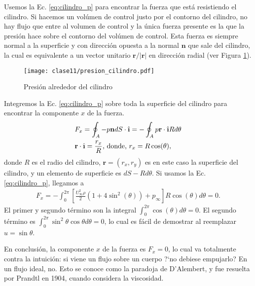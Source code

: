Usemos la Ec. \eqref{eq:cilindro_p} para encontrar la fuerza que está resistiendo el cilindro.
Si hacemos un volúmen de control justo por el contorno del cilindro, no hay flujo que entre al volumen de control y la única fuerza presente es la que la presión hace sobre el contorno del volúmen de control.
Esta fuerza es siempre normal a la superficie y con dirección opuesta a la normal $\mathbf{n}$ que sale del cilindro, la cual es equivalente a un vector unitario $\mathbf{r}/|\mathbf{r}|$ en dirección radial (ver Figura \ref{fig:presion_cilindro}).
%
\begin{figure}[h!]
\centering
\texttt{[image: clase11/presion\_cilindro.pdf]}
\caption{Presión alrededor del cilindro}
\label{fig:presion_cilindro}
\end{figure}

Integremos la Ec. \eqref{eq:cilindro_p} sobre toda la superficie del cilindro para encontrar la componente $x$ de la fuerza.
%
\begin{align}\label{eq:fuerza_x}
&F_x = \oint_A -p\mathbf{n}dS\cdot\ihat = -\oint_A p\mathbf{r}\cdot\ihat Rd\theta \nonumber\\
&\mathbf{r}\cdot\ihat =\frac{r_x}{R} \text{, donde, } r_x = R\cos(\theta),
\end{align}
%
donde $R$ es el radio del cilindro, $\mathbf{r}=(r_x,r_y)$ es en este caso la superficie del cilindro, y un elemento de superficie es $dS-Rd\theta$.
Si usamos la Ec. \eqref{eq:cilindro_p}, llegamos a
%
\begin{align}
F_x = -\int_0^{2\pi}\left[\frac{U_\infty^2\rho}{2}(1+4\sin^2(\theta))+p_\infty\right]R\cos(\theta)d\theta=0.
\end{align}
El primer y segundo término son la integral $\int_0^{2\pi}\cos(\theta)d\theta=0$.
El segundo término es $\int_0^{2\pi}\sin^2\theta\cos\theta d\theta=0$, lo cual es fácil de demostrar al reemplazar $u=\sin\theta$.

En conclusión, la componente $x$ de la fuerza es $F_x=0$, lo cual va totalmente contra la intuición: si viene un flujo sobre un cuerpo \mbox{?`}no debiese empujarlo? En un flujo ideal, no.
Esto se conoce como la paradoja de D'Alembert, y fue resuelta por Prandtl en 1904, cuando considera la viscosidad. 

